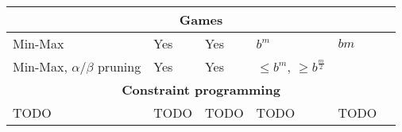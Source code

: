 \documentclass[]{article}
\begin{document}
\begin{table}[h]
\begin{tabular}{|p{12em}|p{4em}|p{4em}|p{3em}|p{3em}|p{13em}|}
		\hline
		\multicolumn{6}{|c|}{\textbf{Games}} \\
		\hline
		Min-Max & Yes & Yes & $b^m$ & $bm$ & \\
		\hline
		Min-Max, $\alpha/\beta$ pruning & Yes & Yes & $\le b^m$, $\ge b^{\frac{m}{2}}$ &  &  \\
		\hline
		\multicolumn{6}{|c|}{\textbf{Constraint programming}} \\
		\hline
		TODO & TODO & TODO & TODO & TODO & \\
		\hline
	\end{tabular}
\end{table}
\end{document}
